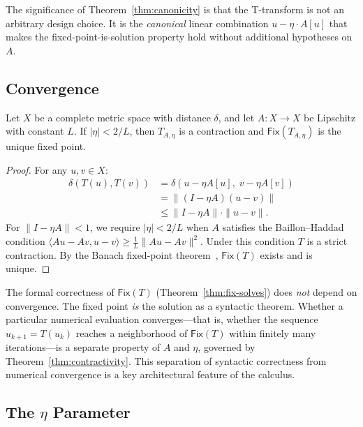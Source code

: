 \documentclass{lmcs}
\theoremstyle{plain}
\theoremstyle{definition}
\newcommand{\fix}{\mathsf{Fix}}
\begin{document}
The significance of Theorem~\ref{thm:canonicity} is that the T-transform is
not an arbitrary design choice. It is the \emph{canonical} linear combination
$u - \eta \cdot A[u]$ that makes the fixed-point-is-solution property hold
without additional hypotheses on $A$.

\subsection{Convergence}

\begin{thm}[Contractivity]\label{thm:contractivity}
Let $X$ be a complete metric space with distance $\delta$, and let
$A : X \to X$ be Lipschitz with constant $L$. If $|\eta| < 2/L$, then
$T_{A,\eta}$ is a contraction and $\fix(T_{A,\eta})$ is the unique fixed
point.
\end{thm}

\begin{proof}
For any $u, v \in X$:
\begin{align*}
\delta(T(u), T(v))
  &= \delta(u - \eta A[u],\; v - \eta A[v]) \\
  &= \| (I - \eta A)(u - v) \| \\
  &\leq \|I - \eta A\| \cdot \|u - v\|.
\end{align*}
For $\|I - \eta A\| < 1$, we require $|\eta| < 2/L$ when $A$ satisfies the
Baillon--Haddad condition $\langle Au - Av, u - v \rangle \geq
\frac{1}{L} \|Au - Av\|^2$. Under this condition $T$ is a strict contraction.
By the Banach fixed-point theorem~\cite{banach1922}, $\fix(T)$ exists and is
unique.
\end{proof}

\begin{rem}
The formal correctness of $\fix(T)$ (Theorem~\ref{thm:fix-solves}) does
\emph{not} depend on convergence. The fixed point \emph{is} the solution as
a syntactic theorem. Whether a particular numerical evaluation
converges---that is, whether the sequence $u_{k+1} = T(u_k)$ reaches a
neighborhood of $\fix(T)$ within finitely many iterations---is a separate
property of $A$ and $\eta$, governed by Theorem~\ref{thm:contractivity}.
This separation of syntactic correctness from numerical convergence is a key
architectural feature of the calculus.
\end{rem}

\subsection{The \texorpdfstring{$\eta$}{eta} Parameter}
\end{document}
